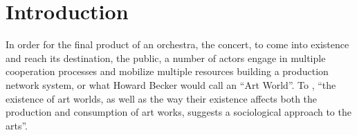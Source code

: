 \documentclass[a4paper, 12pt, openright, oneside, german, french, brazil, english]{abntex2}
\begin{document}
\pretextual
\imprimirfolhaderosto

 \listoffigures
 \listoftables
\newpage
\tableofcontents


	
	\textual
	\chapter{Introduction}


	In order for the final product of an orchestra, the concert, to come into existence and reach its destination, the public, a number of actors engage in multiple cooperation processes and mobilize multiple resources building a production network system, or what Howard Becker would call an ``Art World''. To , ``the existence of art worlds, as well as the way their existence affects both the production and consumption of art works, suggests a sociological approach to the arts''.
	
\end{document}
